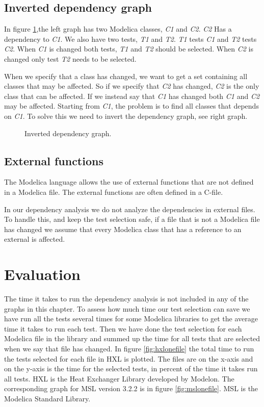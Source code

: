 \documentclass{cslthse-msc}
\begin{document}
\section{Inverted dependency graph}
In figure \ref{fig:invertedGraph},the left graph has two Modelica classes, \textit{C1} and \textit{C2}. \textit{C2} Has a dependency to \textit{C1}. We also have two tests, \textit{T1} and \textit{T2}. \textit{T1} tests \textit{C1} and \textit{T2} tests \textit{C2}. When \textit{C1} is changed both tests, \textit{T1} and \textit{T2} should be selected. When \textit{C2} is changed only test \textit{T2} needs to be selected.

When we specify that a class has changed, we want to get a set containing all classes that may be affected. So if we specify that \textit{C2} has changed, \textit{C2} is the only class that can be affected. If we instead say that \textit{C1} has changed both \textit{C1} and \textit{C2} may be affected. Starting from \textit{C1}, the problem is to find all classes that depends on \textit{C1}. To solve this we need to invert the dependency graph, see right graph.
\begin{figure}[!htbp]
    \centering
    \qquad
    \caption{Inverted dependency graph.}
    \label{fig:invertedGraph}
\end{figure}

\section{External functions}
The Modelica language allows the use of external functions that are not defined in a Modelica file. The external functions are often defined in a C-file.\cite{modelicamodelica}

In our dependency analysis we do not analyze the dependencies in external files. To handle this, and keep the test selection safe, if a file that is not a Modelica file has changed we assume that every Modelica class that has a reference to an external is affected.
\chapter[Evaluation]{Evaluation}
The time it takes to run the dependency analysis is not included in any of the graphs in this chapter.
To assess how much time our test selection can save we have run all the tests several times for some Modelica libraries to get the average time it takes to run each test. Then we have done the test selection for each Modelica file in the library and summed up the time for all tests that are selected when we say that file has changed. In figure \ref{fig:hxlonefile} the total time to run the tests selected for each file in HXL is plotted. The files are on the x-axis and on the y-axis is the time for the selected tests, in percent of the time it takes run all tests. HXL is the Heat Exchanger Library developed by Modelon. The corresponding graph for MSL version 3.2.2 is in figure \ref{fig:mslonefile}. MSL is the Modelica Standard Library.
\end{document}
